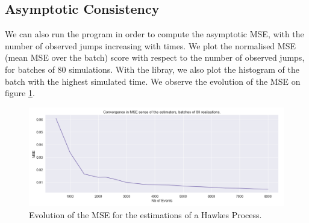 \subsection{Asymptotic Consistency}

We can also run the program in order to compute the asymptotic MSE, with the number of observed jumps increasing with times. We plot the normalised MSE (mean MSE over the batch) score with respect to the number of observed jumps, for batches of 80 simulations. With the libray, we also plot the histogram of the batch with the highest simulated time. We observe the evolution of the MSE on figure \ref{fig:MSE_1}.





\begin{figure}
\centering
\includegraphics[width = 0.99 \textwidth]{../imag/chap2/MSE_score.png}
\caption{Evolution of the MSE for the estimations of a Hawkes Process.}
\label{fig:MSE_1}
\end{figure}
